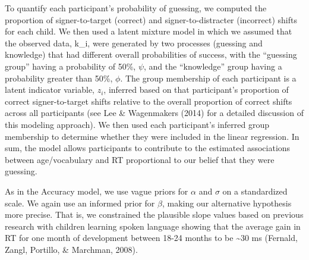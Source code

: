 \documentclass[oneside]{report}
\begin{document}
To quantify each participant's probability of guessing, we computed the
proportion of signer-to-target (correct) and signer-to-distracter
(incorrect) shifts for each child. We then used a latent mixture model
in which we assumed that the observed data, k\_i, were generated by two
processes (guessing and knowledge) that had different overall
probabilities of success, with the ``guessing group'' having a
probability of 50\%, \(\psi\), and the ``knowledge'' group having a
probability greater than 50\%, \(\phi\). The group membership of each
participant is a latent indicator variable, \(z_i\), inferred based on
that participant's proportion of correct signer-to-target shifts
relative to the overall proportion of correct shifts across all
participants (see Lee \& Wagenmakers (2014) for a detailed discussion of
this modeling approach). We then used each participant's inferred group
membership to determine whether they were included in the linear
regression. In sum, the model allows participants to contribute to the
estimated associations between age/vocabulary and RT proportional to our
belief that they were guessing.

As in the Accuracy model, we use vague priors for \(\alpha\) and
\(\sigma\) on a standardized scale. We again use an informed prior for
\(\beta\), making our alternative hypothesis more precise. That is, we
constrained the plausible slope values based on previous research with
children learning spoken language showing that the average gain in RT
for one month of development between 18-24 months to be
\textasciitilde{}30 ms (Fernald, Zangl, Portillo, \& Marchman, 2008).
\end{document}

